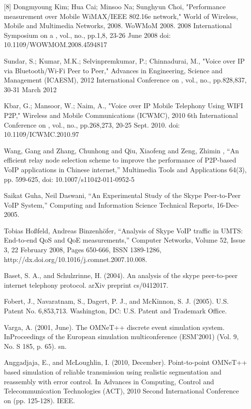 \documentclass[conference]{IEEEtran}
\begin{document}
\begin{thebibliography}{10}
\bibitem{}
[8] Dongmyoung Kim; Hua Cai; Minsoo Na; Sunghyun Choi, "Performance measurement 
over Mobile WiMAX/IEEE 802.16e network," World of Wireless, Mobile and 
Multimedia Networks, 2008. WoWMoM 2008. 2008 International Symposium on a , 
vol., no., pp.1,8, 23-26 June 2008
doi: 10.1109/WOWMOM.2008.4594817
 
\bibitem{}
Sundar, S.; Kumar, M.K.; Selvinpremkumar, P.; Chinnadurai, M., "Voice over 
IP via Bluetooth/Wi-Fi Peer to Peer," Advances in Engineering, Science and 
Management (ICAESM), 2012 International Conference on , vol., no., pp.828,837, 
30-31 March 2012

\bibitem{}
Kbar, G.; Mansoor, W.; Naim, A., "Voice over IP Mobile Telephony Using WIFI 
P2P," Wireless and Mobile Communications (ICWMC), 2010 6th International 
Conference on , vol., no., pp.268,273, 20-25 Sept. 2010. doi: 
10.1109/ICWMC.2010.97
 
\bibitem{}
Wang, Gang and Zhang, Chunhong and Qiu, Xiaofeng and Zeng, Zhimin , “An 
efficient relay node selection scheme to improve the performance of P2P-based 
VoIP applications in Chinese internet,” Multimedia Tools and Applications 64(3), 
pp. 599-625, doi: 10.1007/s11042-011-0952-5

\bibitem{}
Saikat Guha, Neil Daswani, “An Experimental Study of the Skype Peer-to-Peer 
VoIP System,” Computing and Information Science Technical Reports, 16-Dec-2005.

\bibitem{}
Tobias Hoßfeld, Andreas Binzenhöfer, “Analysis of Skype VoIP traffic in 
UMTS: End-to-end QoS and QoE measurements,” Computer Networks, Volume 52, Issue 
3, 22 February 2008, Pages 650-666, ISSN 1389-1286, 
http://dx.doi.org/10.1016/j.comnet.2007.10.008.

\bibitem{}
Baset, S. A., and Schulzrinne, H. (2004). An analysis of the skype 
peer-to-peer internet telephony protocol. arXiv preprint cs/0412017.

\bibitem{}
Fobert, J., Navaratnam, S., Dagert, P. J., and McKinnon, S. J. (2005). U.S. 
Patent No. 6,853,713. Washington, DC: U.S. Patent and Trademark Office.

\bibitem{}
Varga, A. (2001, June). The OMNeT++ discrete event simulation system. 
InProceedings of the European simulation multiconference (ESM’2001) (Vol. 9, No. 
S 185, p. 65). sn.

\bibitem{}
Anggadjaja, E., and McLoughlin, I. (2010, December). Point-to-point OMNeT++ 
based simulation of reliable transmission using realistic segmentation and 
reassembly with error control. In Advances in Computing, Control and 
Telecommunication Technologies (ACT), 2010 Second International Conference on 
(pp. 125-128). IEEE.


\end{thebibliography}
\end{document}

